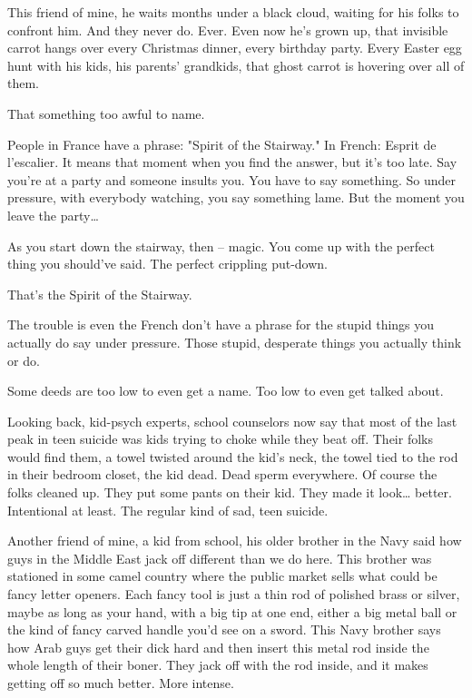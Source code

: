 \documentclass[10pt,a5paper,twoside]{book}
\begin{document}
This friend of mine, he waits months under a black cloud, waiting for his folks to confront him. And they never do. Ever. Even now he's grown up, that invisible carrot hangs over every Christmas dinner, every birthday party. Every Easter egg hunt with his kids, his parents' grandkids, that ghost carrot is hovering over all of them.

That something too awful to name.

People in France have a phrase: "Spirit of the Stairway." In French: Esprit de l'escalier. It means that moment when you find the answer, but it's too late. Say you're at a party and someone insults you. You have to say something. So under pressure, with everybody watching, you say something lame. But the moment you leave the party…

As you start down the stairway, then -- magic. You come up with the perfect thing you should've said. The perfect crippling put-down.

That's the Spirit of the Stairway.

The trouble is even the French don't have a phrase for the stupid things you actually do say under pressure. Those stupid, desperate things you actually think or do.

Some deeds are too low to even get a name. Too low to even get talked about.

Looking back, kid-psych experts, school counselors now say that most of the last peak in teen suicide was kids trying to choke while they beat off. Their folks would find them, a towel twisted around the kid's neck, the towel tied to the rod in their bedroom closet, the kid dead. Dead sperm everywhere. Of course the folks cleaned up. They put some pants on their kid. They made it look… better. Intentional at least. The regular kind of sad, teen suicide.

Another friend of mine, a kid from school, his older brother in the Navy said how guys in the Middle East jack off different than we do here. This brother was stationed in some camel country where the public market sells what could be fancy letter openers. Each fancy tool is just a thin rod of polished brass or silver, maybe as long as your hand, with a big tip at one end, either a big metal ball or the kind of fancy carved handle you'd see on a sword. This Navy brother says how Arab guys get their dick hard and then insert this metal rod inside the whole length of their boner. They jack off with the rod inside, and it makes getting off so much better. More intense.
\end{document}
